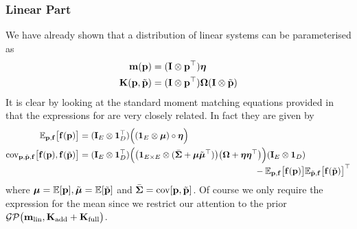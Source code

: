 \subsubsection{Linear Part}
We have already shown that a distribution of linear systems can be parameterised as
\begin{align*}
\mathbf{m}(\mathbf{p}) &= (\mathbf{I} \otimes \mathbf{p}^\top)\boldsymbol{\eta} \\
\mathbf{K}(\mathbf{p},\tilde{\mathbf{p}}) &= (\mathbf{I} \otimes \mathbf{p}^\top) \boldsymbol{\Omega} (\mathbf{I} \otimes \tilde{\mathbf{p}})
\end{align*}
It is clear by looking at the standard moment matching equations provided in  that the expressions for  are very closely related. In fact they are given by
\begin{align*}
\EE_{\bp,\bff}\big[\bff(\bp)\big]  
&= (\bI_E \otimes \mathbf{1}_D\T) \Big( (\mathbf{1}_E  \otimes \bm) \circ \bet \Big) \\
%
\cov_{\bp,\tbp,\bff}\big[\bff(\bp), \bff(\tbp)\big] &= 
 (\bI_E \otimes \mathbf{1}_D\T)
\Big(\big(  \mathbf{1}_{E\times E}\otimes  (\bar\bS + \bm\tilde\bm\T) \big) \big(\bOm+\bet\bet\T\big) \Big) 
 (\bI_E \otimes \mathbf{1}_D) \\[-0.1cm]
& \qquad\qquad\qquad\qquad\qquad\qquad\qquad\qquad\qquad\qquad
- \EE_{\bp,\bff}\big[\bff(\bp)\big] \EE_{\tbp,\bff}\big[\bff(\tbp)\big] \T
\end{align*}
where $\boldsymbol{\mu} = \mathbb{E}[\mathbf{p}], \tilde{\boldsymbol{\mu}} = \mathbb{E}[\tilde{\mathbf{p}}]$ and $\bar{\boldsymbol{\Sigma}} = \mathrm{cov}[\mathbf{p},\tilde{\mathbf{p}}]$. Of course we only require the expression for the mean since we restrict our attention to the prior $\mathcal{GP}\big(\mathbf{m}_{\text{lin}}, \mathbf{K}_{\text{add}} + \mathbf{K}_{\text{full}} \big)$.







